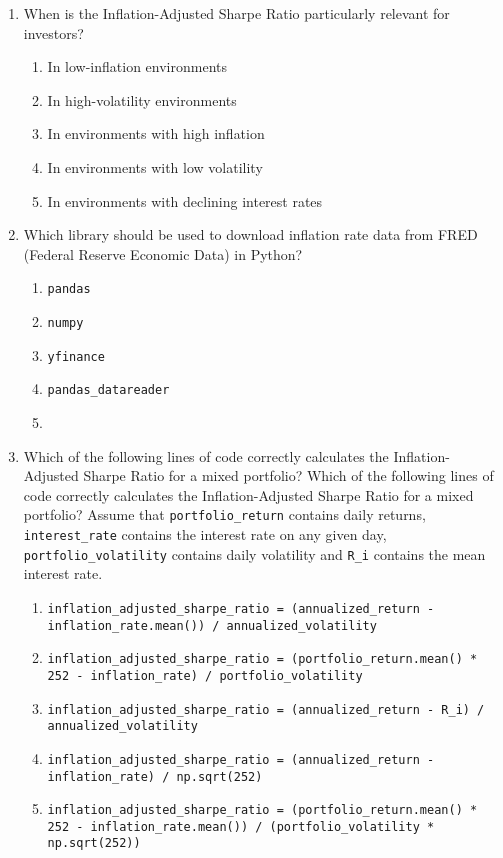 \documentclass{article}
\begin{document}
\begin{enumerate}
    \item When is the Inflation-Adjusted Sharpe Ratio particularly relevant for investors?
    \begin{enumerate}
        \item In low-inflation environments
        \item In high-volatility environments
        \item In environments with high inflation
        \item In environments with low volatility
        \item In environments with declining interest rates
    \end{enumerate}

    \item Which library should be used to download inflation rate data from FRED (Federal Reserve Economic Data) in Python?
    \begin{enumerate}
        \item \texttt{pandas}
        \item \texttt{numpy}
        \item \texttt{yfinance}
        \item \texttt{pandas\_datareader}
        \item \texttt{}
    \end{enumerate}

    \item Which of the following lines of code correctly calculates the Inflation-Adjusted Sharpe Ratio for a mixed portfolio? Which of the following lines of code correctly calculates the Inflation-Adjusted Sharpe Ratio for a mixed portfolio? Assume that \texttt{portfolio\_return} contains daily returns, \texttt{interest\_rate} contains the interest rate on any given day, \texttt{portfolio\_volatility} contains daily volatility and \texttt{R\_i} contains the mean interest rate.
    \begin{enumerate}
        \item \texttt{inflation\_adjusted\_sharpe\_ratio = (annualized\_return - inflation\_rate.mean()) / annualized\_volatility}
        \item \texttt{inflation\_adjusted\_sharpe\_ratio = (portfolio\_return.mean() * 252 - inflation\_rate) / portfolio\_volatility}
        \item \texttt{inflation\_adjusted\_sharpe\_ratio = (annualized\_return - R\_i) / annualized\_volatility}
        \item \texttt{inflation\_adjusted\_sharpe\_ratio = (annualized\_return - inflation\_rate) / np.sqrt(252)}
        \item \texttt{inflation\_adjusted\_sharpe\_ratio = (portfolio\_return.mean() * 252 - inflation\_rate.mean()) / (portfolio\_volatility * np.sqrt(252))}
    \end{enumerate}

\end{enumerate}
\end{document}
